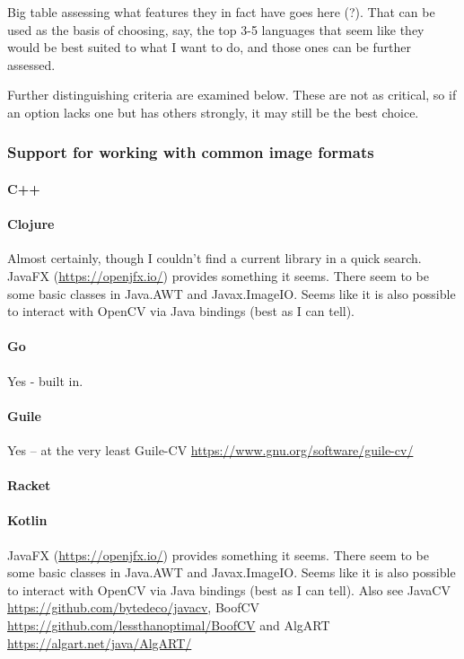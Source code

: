 Big table assessing what features they in fact have goes here (?).  That can be used as the basis of choosing, say, the top 3-5 languages that seem like they would be best suited to what I want to do, and those ones can be further assessed.



Further distinguishing criteria are examined below.  These are not as critical, so if an option lacks one but has others strongly, it may still be the best choice.

\subsubsection{Support for working with common image formats}

\paragraph{C++}

\paragraph{Clojure}
Almost certainly, though I couldn't find a current library in a quick search.  JavaFX (\url{https://openjfx.io/}) provides something it seems.  There seem to be some basic classes in Java.AWT and Javax.ImageIO.  Seems like it is also possible to interact with OpenCV via Java bindings (best as I can tell).

\paragraph{Go}
Yes - built in.

\paragraph{Guile}
Yes -- at the very least Guile-CV \url{https://www.gnu.org/software/guile-cv/}

\paragraph{Racket}

\paragraph{Kotlin}
JavaFX (\url{https://openjfx.io/}) provides something it seems.  There seem to be some basic classes in Java.AWT and Javax.ImageIO.  Seems like it is also possible to interact with OpenCV via Java bindings (best as I can tell).  Also see JavaCV \url{https://github.com/bytedeco/javacv}, BoofCV \url{https://github.com/lessthanoptimal/BoofCV} and AlgART \url{https://algart.net/java/AlgART/}


